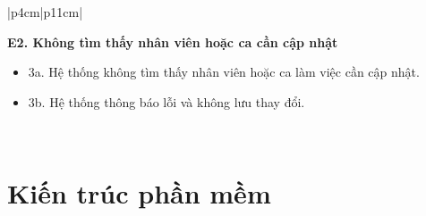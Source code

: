 \begin{longtable}{|p{4cm}|p{11cm}|}
\begin{minipage}[t]{\linewidth}
\textbf{E2. Không tìm thấy nhân viên hoặc ca cần cập nhật}
\begin{itemize}
\item 3a. Hệ thống không tìm thấy nhân viên hoặc ca làm việc cần cập nhật.
\item 3b. Hệ thống thông báo lỗi và không lưu thay đổi.
\end{itemize}

\vspace{0.3mm}
\end{minipage}
\\ \hline

\end{longtable}
\pagebreak
\section{Kiến trúc phần mềm}
